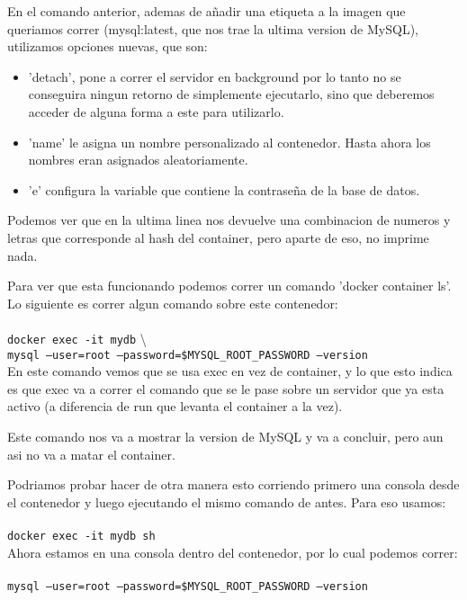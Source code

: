 \documentclass[11pt]{article} %
\begin{document}
En el comando anterior, ademas de añadir una etiqueta a la imagen que queriamos correr (mysql:latest, que nos trae la ultima version de MySQL), utilizamos opciones nuevas, que son:
\begin{itemize}
	\item 	
 	'detach', pone a correr el servidor en background por lo tanto no se conseguira ningun retorno de simplemente ejecutarlo, sino que deberemos acceder de alguna forma a este para utilizarlo.
 	
 	\item
	'name' le asigna un nombre personalizado al contenedor. Hasta ahora los nombres eran asignados aleatoriamente.
	
	\item
	'e' configura la variable que contiene la contraseña de la base de datos.

\end{itemize}

Podemos ver que en la ultima linea nos devuelve una combinacion de numeros y letras que corresponde al hash del container, pero aparte de eso, no imprime nada.

Para ver que esta funcionando podemos correr un comando 'docker container ls'. Lo siguiente es correr algun comando sobre este contenedor:\\ \\
	\texttt{docker exec -it mydb} \textbackslash \\
	\texttt{mysql --user=root --password=\$MYSQL\_ROOT\_PASSWORD --version}\\

En este comando vemos que se usa exec en vez de container, y lo que esto indica es que exec va a correr el comando que se le pase sobre un servidor que ya esta activo (a diferencia de run que levanta el container a la vez). 

Este comando nos va a mostrar la version de MySQL y va a concluir, pero aun asi no va a matar el container. 

Podriamos probar hacer de otra manera esto corriendo primero una consola desde el contenedor y luego ejecutando el mismo comando de antes. Para eso usamos:\\ \\
	\texttt{docker exec -it mydb sh} \\

Ahora estamos en una consola dentro del contenedor, por lo cual podemos correr: \\ \\
	\texttt{mysql --user=root --password=\$MYSQL\_ROOT\_PASSWORD --version} \\
\end{document}
